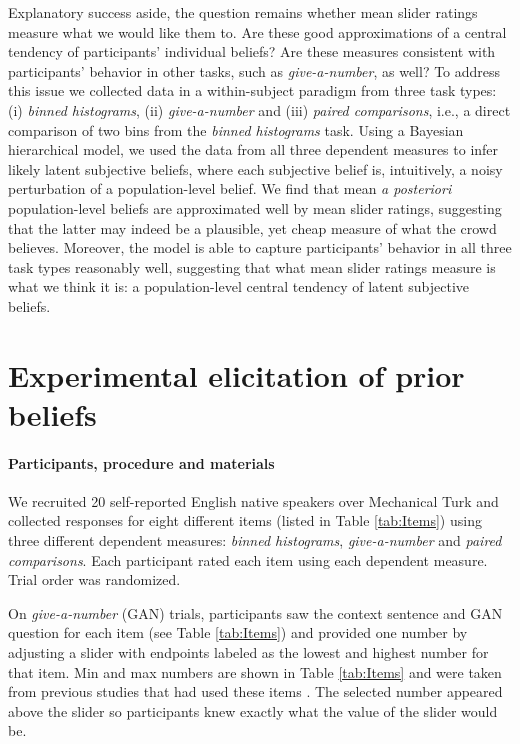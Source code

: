 \documentclass[10pt,letterpaper]{article}
\newcommand{\tableref}[1]{Table \ref{#1}}
\begin{document}
Explanatory success aside, the question remains whether mean slider ratings measure
what we would like them to. Are these good approximations of a central tendency of participants'
individual beliefs? Are these measures consistent with participants' behavior in other tasks, such
as \emph{give-a-number}, as well? To address this issue we collected data in a within-subject paradigm 
from three task types: (i) \emph{binned histograms}, (ii) \emph{give-a-number} and (iii)
\emph{paired comparisons}, i.e., a direct comparison of two bins from the \emph{binned
  histograms} task. Using a Bayesian hierarchical model, we used the data from all three
dependent measures to infer likely latent subjective beliefs, where each subjective belief is,
intuitively, a noisy perturbation of a population-level belief. We find that mean \emph{a
  posteriori} population-level beliefs are approximated well by mean slider ratings, suggesting
that the latter may indeed be a plausible, yet cheap measure of what the crowd believes.
Moreover, the model is able to capture participants' behavior in all three task types reasonably
well, suggesting that what mean slider ratings measure is what we think it is: a population-level
central tendency of latent subjective beliefs.

\section{Experimental elicitation of prior beliefs}

\paragraph{Participants, procedure and materials} We recruited 20 self-reported English native
speakers over Mechanical Turk and collected responses for eight different items (listed in
\tableref{tab:Items}) using three different dependent measures: \emph{binned histograms},
\emph{give-a-number} and \emph{paired comparisons}. Each participant rated each item using each
dependent measure. Trial order was randomized.



On \emph{give-a-number} (GAN) trials, participants saw the context sentence and GAN question
for each item (see \tableref{tab:Items}) and provided one number by adjusting a
slider with endpoints labeled as the lowest and highest number for that item. Min and max
numbers are shown in \tableref{tab:Items} and were taken from previous studies that had used
these items
\cite{DegenTessler2015:Wonky-worlds:-L,SchollerFranke2015:Semantic-values,KaoWu2014:Nonliteral-Unde}. The
selected number appeared above the slider so participants knew exactly what the value of the
slider would be.
\end{document}
